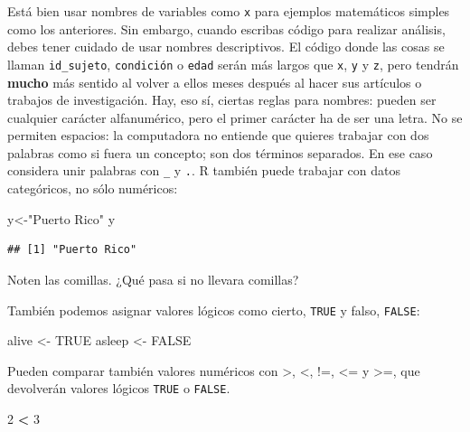 \documentclass[
]{article}
\newenvironment{Shaded}{\begin{snugshade}}{\end{snugshade}}
\newcommand{\ConstantTok}[1]{\textcolor[rgb]{0.56,0.35,0.01}{#1}}
\newcommand{\DecValTok}[1]{\textcolor[rgb]{0.00,0.00,0.81}{#1}}
\newcommand{\NormalTok}[1]{#1}
\newcommand{\OtherTok}[1]{\textcolor[rgb]{0.56,0.35,0.01}{#1}}
\newcommand{\SpecialCharTok}[1]{\textcolor[rgb]{0.81,0.36,0.00}{\textbf{#1}}}
\newcommand{\StringTok}[1]{\textcolor[rgb]{0.31,0.60,0.02}{#1}}
\begin{document}
Está bien usar nombres de variables como \texttt{x} para ejemplos
matemáticos simples como los anteriores. Sin embargo, cuando escribas
código para realizar análisis, debes tener cuidado de usar nombres
descriptivos. El código donde las cosas se llaman \texttt{id\_sujeto},
\texttt{condición} o \texttt{edad} serán más largos que \texttt{x},
\texttt{y} y \texttt{z}, pero tendrán \textbf{mucho} más sentido al
volver a ellos meses después al hacer sus artículos o trabajos de
investigación. Hay, eso sí, ciertas reglas para nombres: pueden ser
cualquier carácter alfanumérico, pero el primer carácter ha de ser una
letra. No se permiten espacios: la computadora no entiende que quieres
trabajar con dos palabras como si fuera un concepto; son dos términos
separados. En ese caso considera unir palabras con \texttt{\_} y
\texttt{.}. R también puede trabajar con datos categóricos, no sólo
numéricos:

\begin{Shaded}
\begin{Highlighting}[]
\NormalTok{y}\OtherTok{\textless{}{-}}\StringTok{"Puerto Rico"}
\NormalTok{y}
\end{Highlighting}
\end{Shaded}

\begin{verbatim}
## [1] "Puerto Rico"
\end{verbatim}

Noten las comillas. ¿Qué pasa si no llevara comillas?

También podemos asignar valores lógicos como cierto, \texttt{TRUE} y
falso, \texttt{FALSE}:

\begin{Shaded}
\begin{Highlighting}[]
\NormalTok{alive }\OtherTok{\textless{}{-}} \ConstantTok{TRUE}
\NormalTok{asleep }\OtherTok{\textless{}{-}} \ConstantTok{FALSE}
\end{Highlighting}
\end{Shaded}

Pueden comparar también valores numéricos con \textgreater, \textless,
!=, \textless= y \textgreater=, que devolverán valores lógicos
\texttt{TRUE} o \texttt{FALSE}.

\begin{Shaded}
\begin{Highlighting}[]
\DecValTok{2} \SpecialCharTok{\textless{}} \DecValTok{3}
\end{Highlighting}
\end{Shaded}
\end{document}
